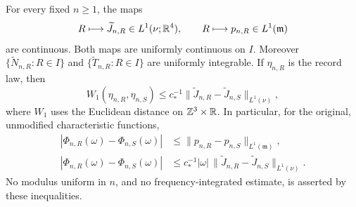 \begin{theorem}
\label{thm:return-stability}
For every fixed $n\ge1$, the maps
\begin{equation}\label{eq:return-Lone}
 R\longmapsto\widetilde J_{n,R}\in L^1(\nu;\R^4),\qquad
 R\longmapsto p_{n,R}\in L^1(\mathfrak m)
\end{equation}
are continuous. Both maps are uniformly continuous on $I$.
Moreover $\{\widetilde N_{n,R}:R\in I\}$ and
$\{\widetilde T_{n,R}:R\in I\}$ are uniformly integrable.
If $\eta_{n,R}$ is the record law, then
\begin{equation}\label{eq:record-Wone}
 W_1(\eta_{n,R},\eta_{n,S})
 \le c_*^{-1}\|\widetilde J_{n,R}-\widetilde J_{n,S}\|_{L^1(\nu)},
\end{equation}
where $W_1$ uses the Euclidean distance on $\mathbb Z^3\times\mathbb R$.
In particular, for the original, unmodified characteristic functions,
\begin{align}\label{eq:raw-frequency-comparison}
 |\Phi_{n,R}(\omega)-\Phi_{n,S}(\omega)|
 &\le \|p_{n,R}-p_{n,S}\|_{L^1(\mathfrak m)},\nonumber\\
 |\Phi_{n,R}(\omega)-\Phi_{n,S}(\omega)|
 &\le c_*^{-1}|\omega|\,
       \|\widetilde J_{n,R}-\widetilde J_{n,S}\|_{L^1(\nu)}.
\end{align}
No modulus uniform in $n$, and no frequency-integrated estimate, is
asserted by these inequalities.
\end{theorem}

